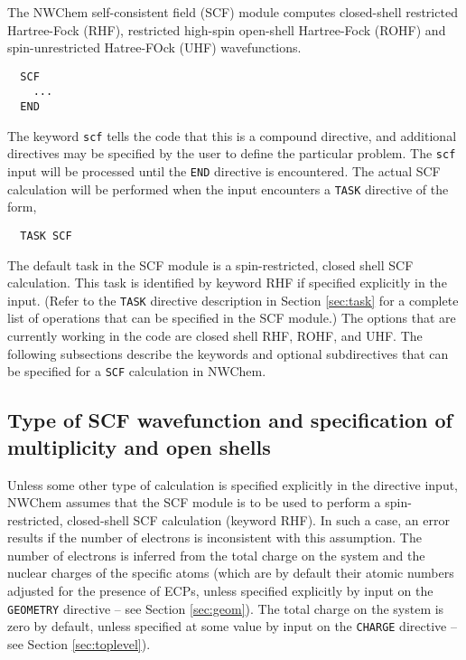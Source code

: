 \label{SCF} 

The NWChem self-consistent field (SCF) module computes closed-shell
restricted Hartree-Fock (RHF), restricted high-spin open-shell
Hartree-Fock (ROHF) and spin-unrestricted Hatree-FOck (UHF)
wavefunctions.

\begin{verbatim}
  SCF
    ...
  END
\end{verbatim}

The keyword \verb+scf+ tells the code that this is a compound directive,
and additional directives may be specified by the user to define the particular
problem.  The \verb+scf+ input will be processed until the
\verb+END+ directive is encountered.  The actual SCF calculation will
be performed when the input encounters a \verb+TASK+ directive of the form,

\begin{verbatim}
  TASK SCF
\end{verbatim}

The default task in the SCF module is a spin-restricted, 
closed shell SCF calculation.  This task is identified by keyword RHF if specified 
explicitly in the input.  (Refer to the \verb+TASK+ directive description in
Section \ref{sec:task} for a complete list of operations that can be
specified in the SCF module.)  The options that are currently working
in the code are closed shell RHF, ROHF, and UHF. The following 
subsections describe the keywords and
optional subdirectives that can be specified for a \verb+SCF+ calculation
in NWChem.


\subsection{Type of SCF wavefunction and specification of multiplicity
and open shells}

Unless some other type of calculation is specified explicitly in
the directive input, NWChem assumes that the SCF module is to be used
to perform a spin-restricted,
closed-shell SCF calculation (keyword RHF).  In such a case, an error results
if the number of electrons is inconsistent with this assumption.
The number of electrons is inferred from the
total charge on the system and the nuclear charges of the
specific atoms (which are by default their atomic numbers
adjusted for the presence of ECPs, unless specified
explicitly by input on the \verb+GEOMETRY+ directive -- see Section 
\ref{sec:geom}).  The total charge on the system is zero by default, 
unless specified at
some value by input on the \verb+CHARGE+ directive -- see Section 
\ref{sec:toplevel}).

